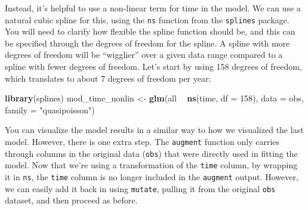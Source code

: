 \documentclass[
]{book}
\newenvironment{Shaded}{\begin{snugshade}}{\end{snugshade}}
\newcommand{\DataTypeTok}[1]{\textcolor[rgb]{0.13,0.29,0.53}{#1}}
\newcommand{\DecValTok}[1]{\textcolor[rgb]{0.00,0.00,0.81}{#1}}
\newcommand{\FloatTok}[1]{\textcolor[rgb]{0.00,0.00,0.81}{#1}}
\newcommand{\KeywordTok}[1]{\textcolor[rgb]{0.13,0.29,0.53}{\textbf{#1}}}
\newcommand{\NormalTok}[1]{#1}
\newcommand{\OperatorTok}[1]{\textcolor[rgb]{0.81,0.36,0.00}{\textbf{#1}}}
\newcommand{\StringTok}[1]{\textcolor[rgb]{0.31,0.60,0.02}{#1}}
\begin{document}
Instead, it's helpful to use a non-linear term for time in the model. We can
use a natural cubic spline for this, using the \texttt{ns} function from the \texttt{splines}
package. You will need to clarify how flexible the spline function should be,
and this can be specified through the degrees of freedom for the spline. A
spline with more degrees of freedom will be ``wigglier'' over a given data range
compared to a spline with fewer degrees of freedom. Let's start by using
158 degrees of freedom, which translates to about 7 degrees of freedom per year:

\begin{Shaded}
\begin{Highlighting}[]
\KeywordTok{library}\NormalTok{(splines)}
\NormalTok{mod_time_nonlin <-}\StringTok{ }\KeywordTok{glm}\NormalTok{(all }\OperatorTok{~}\StringTok{ }\KeywordTok{ns}\NormalTok{(time, }\DataTypeTok{df =} \DecValTok{158}\NormalTok{), }
                       \DataTypeTok{data =}\NormalTok{ obs, }\DataTypeTok{family =} \StringTok{"quasipoisson"}\NormalTok{)}
\end{Highlighting}
\end{Shaded}

You can visualize the model results in a similar way to how we visualized the
last model. However, there is one extra step. The \texttt{augment} function only
carries through columns in the original data (\texttt{obs}) that were directly used
in fitting the model. Now that we're using a transformation of the \texttt{time}
column, by wrapping it in \texttt{ns}, the \texttt{time} column is no longer included in the
\texttt{augment} output. However, we can easily add it back in using \texttt{mutate},
pulling it from the original \texttt{obs} dataset, and then proceed as before.

\begin{Shaded}
\end{Shaded}
\end{document}
